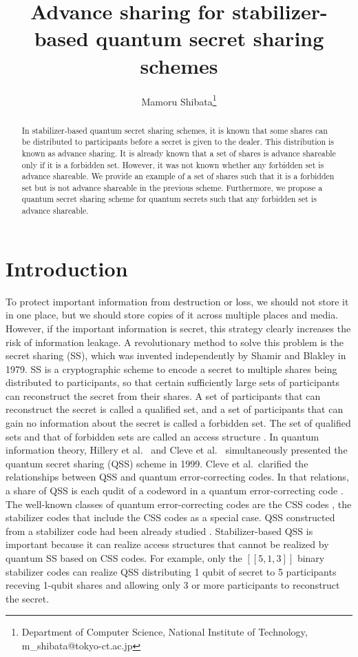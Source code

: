 \documentclass[11pt,a4paper]{article}
\title{Advance sharing for stabilizer-based quantum secret sharing schemes}
\author{Mamoru Shibata\thanks{Department of Computer Science, National Institute of Technology, m\_shibata@tokyo-ct.ac.jp}}
\theoremstyle{definition}
\begin{document}
\maketitle
\begin{abstract}
    In stabilizer-based quantum secret sharing schemes, it is known that some shares can be distributed to participants before a secret is given to the dealer. 
    This distribution is known as advance sharing.
    It is already known that a set of shares is advance shareable only if it is a forbidden set.
    However, it was not known whether any forbidden set is advance shareable. 
    We provide an example of a set of shares such that it is a forbidden set but is not advance shareable in the previous scheme.
    Furthermore, we propose a quantum secret sharing scheme for quantum secrets such that any forbidden set is advance shareable.
\end{abstract}

\section{Introduction}
To protect important information from destruction or loss, we should not store it in one place, but we should store copies of it across multiple places and media. 
However, if the important information is secret, this strategy clearly increases the risk of information leakage.
A revolutionary method to solve this problem is the secret sharing (SS), which was invented independently by Shamir \cite{SS_Shamir_1979} and Blakley \cite{SS_Blakley_1979} in 1979.
SS is a cryptographic scheme to encode a secret to multiple shares being distributed to participants, 
so that certain sufficiently large sets of participants can reconstruct the secret from their shares.
A set of participants that can reconstruct the secret is called a qualified set, and 
a set of participants that can gain no information about the secret is called a forbidden set.
The set of qualified sets and that of forbidden sets are called an access structure \cite{stinson2005cryptography}. 
In quantum information theory, Hillery et al.\ \cite{QSS_Hillery_1999} and Cleve et al.\ \cite{QSS_Cleve_1999} simultaneously presented the quantum secret sharing (QSS) scheme in 1999.
Cleve et al.\ clarified the relationships between QSS and quantum error-correcting codes. 
In that relations, a share of QSS is each qudit of a codeword in a quantum error-correcting code \cite{QSS_Cleve_1999}.
The well-known classes of quantum error-correcting codes are the CSS codes \cite{Calderbank_1996,Steane_1996}, 
the stabilizer codes \cite{gottesman1997stabilizer} that include the CSS codes as a special case.
QSS constructed from a stabilizer code had been already studied \cite{Marin_StabilizerQSS,Markham_StabilizerQSS,Sarvepalli_StabilizerQSS}.
Stabilizer-based QSS is important because it can realize access structures that cannot be realized by quantum SS based on CSS codes.
For example, only the $[[5,1,3]]$ binary stabilizer codes can realize QSS distributing 1 qubit of secret to 5 participants receving 1-qubit shares and allowing only 3 or more participants to reconstruct the secret.
\end{document}
